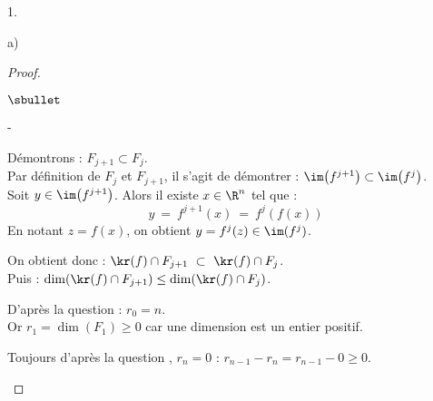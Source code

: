 \documentclass[11pt]{article}%
\begin{document}
\begin{noliste}{1.}
\begin{noliste}{a)}
\begin{proof}
\begin{noliste}{$\sbullet$}
\begin{noliste}{-}
        \item Démontrons : $F_{j+1} \subset F_j$.\\
          Par définition de $F_j$ et $F_{j+1}$, il s'agit de démontrer
          : $\im\big( f^{j+1} \big) \subset \im\big( f^{j} \big)$.\\[.2cm]
	  Soit $y \in \im\big( f^{j+1} \big)$. Alors il existe $x\in
          \R^n$ tel que :
	  \[
          y \ = \ f^{j+1}(x) \ = \ f^j(f(x))
	  \]
	  En notant $z=f(x)$, on obtient $y = f^j(z) \in \im(f^j)$.%
        \item On obtient donc : $\kr(f) \cap F_{j+1} \ \subset \
	  \kr(f) \cap F_j$.\\
	  Puis : $\dim(\kr(f) \cap F_{j+1}) \leq \dim(\kr(f) \cap
          F_j)$. 
	\end{noliste}
          	
      \item D'après la question  : $r_0=n$.\\
	Or $r_1 = \dim(F_1) \geq 0$ car une dimension est un entier
        positif.%
	
      \item Toujours d'après la question , $r_n = 0$ :
        $r_{n-1} -r_n = r_{n-1} - 0 \geq 0$.%
	~\\[-1.4cm]
      \end{noliste}
    \end{proof}
  \end{noliste}
\end{noliste}





\end{document}
